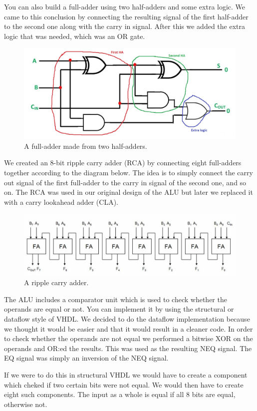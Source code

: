 \documentclass[a4paper,11pt]{article}
\begin{document}
You can also build a full-adder using two half-adders and some extra logic. We came to this conclusion by connecting the resulting signal of the first half-adder to the second one along with the carry in signal. After this we added the extra logic that was needed, which was an OR gate.

\begin{figure}[h!]
  \centering
  \includegraphics[width=0.5\linewidth]{fulladderfromhalfadder.jpg}
  \caption{A full-adder made from two half-adders.}
  \label{fig:etikett}
\end{figure}

We created an 8-bit ripple carry adder (RCA) by connecting eight full-adders together according to the diagram below. The idea is to simply connect the carry out signal of the first full-adder to the carry in signal of the second one, and so on. The RCA was used in our original design of the ALU but later we replaced it with a carry lookahead adder (CLA).

\begin{figure}[h!]
  \centering
  \includegraphics[width=0.9\linewidth]{rca.jpg}
  \caption{A ripple carry adder.}
  \label{fig:etikett}
\end{figure}

The ALU includes a comparator unit which is used to check whether the operands are equal or not. You can implement it by using the structural or dataflow style of VHDL. We decided to do the dataflow implementation because we thought it would be easier and that it would result in a cleaner code. In order to check whether the operands are not equal we performed a bitwise XOR on the operands and OR:ed the results. This was used as the resulting NEQ signal. The EQ signal was simply an inversion of the NEQ signal. 

If we were to do this in structural VHDL we would have to create a component which cheked if two certain bits were not equal. We would then have to create eight such components. The input as a whole is equal if all 8 bits are equal, otherwise not.
\end{document}

